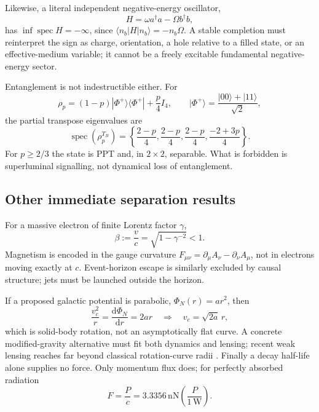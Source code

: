 \documentclass[11pt]{article}
\numberwithin{equation}{section}
\newcommand{\dd}{\mathrm d}
\begin{document}
Likewise, a literal independent negative-energy oscillator,
\begin{equation}
 H=\omega a^\dagger a-\Omega b^\dagger b,
\end{equation}
has \(\inf\operatorname{spec}H=-\infty\), since
\(\langle n_b|H|n_b\rangle=-n_b\Omega\).  A stable completion must reinterpret
the sign as charge, orientation, a hole relative to a filled state, or an
effective-medium variable; it cannot be a freely excitable fundamental
negative-energy sector.

Entanglement is not indestructible either.  For
\begin{equation}
 \rho_p=(1-p)|\Phi^+\rangle\langle\Phi^+|+\frac p4 I_4,
 \qquad |\Phi^+\rangle=\frac{|00\rangle+|11\rangle}{\sqrt2},
\end{equation}
the partial transpose eigenvalues are
\begin{equation}
 \operatorname{spec}(\rho_p^{T_B})
 =\left\{\frac{2-p}{4},\frac{2-p}{4},\frac{2-p}{4},
 \frac{-2+3p}{4}\right\}.
 \label{eq:bellpt}
\end{equation}
For \(p\ge2/3\) the state is PPT and, in \(2\times2\), separable.  What is
forbidden is superluminal signalling, not dynamical loss of entanglement.

\subsection{Other immediate separation results}

For a massive electron of finite Lorentz factor \(\gamma\),
\begin{equation}
 \beta:=\frac vc=\sqrt{1-\gamma^{-2}}<1.
\end{equation}
Magnetism is encoded in the gauge curvature
\(F_{\mu\nu}=\partial_\mu A_\nu-\partial_\nu A_\mu\), not in electrons moving
exactly at \(c\).  Event-horizon escape is similarly excluded by causal
structure; jets must be launched outside the horizon.

If a proposed galactic potential is parabolic, \(\Phi_N(r)=a r^2\), then
\begin{equation}
 \frac{v_c^2}{r}=\frac{\dd\Phi_N}{\dd r}=2ar
 \quad\Longrightarrow\quad v_c=\sqrt{2a}\,r,
\end{equation}
which is solid-body rotation, not an asymptotically flat curve.  A concrete
modified-gravity alternative must fit both dynamics and lensing; recent weak
lensing reaches far beyond classical rotation-curve radii \cite{Mistele2024}.
Finally a decay half-life alone supplies no force.  Only momentum flux does;
for perfectly absorbed radiation
\begin{equation}
 F=\frac Pc=3.3356\,\mathrm{nN}\left(\frac P{1\,\mathrm W}\right).
\end{equation}
\end{document}
